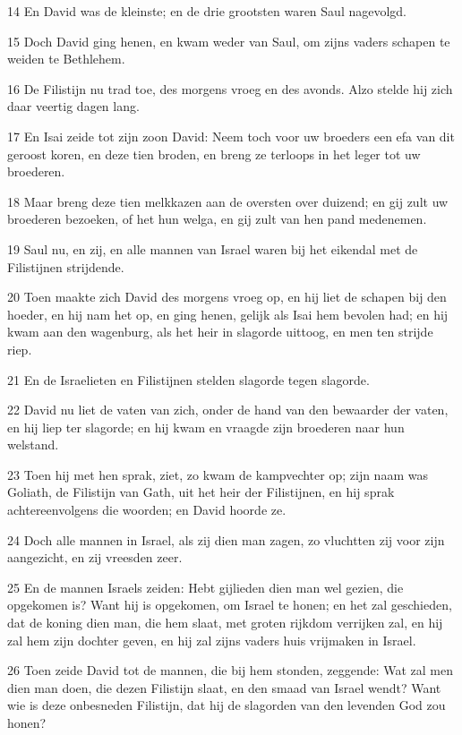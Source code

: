 \par 14 En David was de kleinste; en de drie grootsten waren Saul nagevolgd.
\par 15 Doch David ging henen, en kwam weder van Saul, om zijns vaders schapen te weiden te Bethlehem.
\par 16 De Filistijn nu trad toe, des morgens vroeg en des avonds. Alzo stelde hij zich daar veertig dagen lang.
\par 17 En Isai zeide tot zijn zoon David: Neem toch voor uw broeders een efa van dit geroost koren, en deze tien broden, en breng ze terloops in het leger tot uw broederen.
\par 18 Maar breng deze tien melkkazen aan de oversten over duizend; en gij zult uw broederen bezoeken, of het hun welga, en gij zult van hen pand medenemen.
\par 19 Saul nu, en zij, en alle mannen van Israel waren bij het eikendal met de Filistijnen strijdende.
\par 20 Toen maakte zich David des morgens vroeg op, en hij liet de schapen bij den hoeder, en hij nam het op, en ging henen, gelijk als Isai hem bevolen had; en hij kwam aan den wagenburg, als het heir in slagorde uittoog, en men ten strijde riep.
\par 21 En de Israelieten en Filistijnen stelden slagorde tegen slagorde.
\par 22 David nu liet de vaten van zich, onder de hand van den bewaarder der vaten, en hij liep ter slagorde; en hij kwam en vraagde zijn broederen naar hun welstand.
\par 23 Toen hij met hen sprak, ziet, zo kwam de kampvechter op; zijn naam was Goliath, de Filistijn van Gath, uit het heir der Filistijnen, en hij sprak achtereenvolgens die woorden; en David hoorde ze.
\par 24 Doch alle mannen in Israel, als zij dien man zagen, zo vluchtten zij voor zijn aangezicht, en zij vreesden zeer.
\par 25 En de mannen Israels zeiden: Hebt gijlieden dien man wel gezien, die opgekomen is? Want hij is opgekomen, om Israel te honen; en het zal geschieden, dat de koning dien man, die hem slaat, met groten rijkdom verrijken zal, en hij zal hem zijn dochter geven, en hij zal zijns vaders huis vrijmaken in Israel.
\par 26 Toen zeide David tot de mannen, die bij hem stonden, zeggende: Wat zal men dien man doen, die dezen Filistijn slaat, en den smaad van Israel wendt? Want wie is deze onbesneden Filistijn, dat hij de slagorden van den levenden God zou honen?
